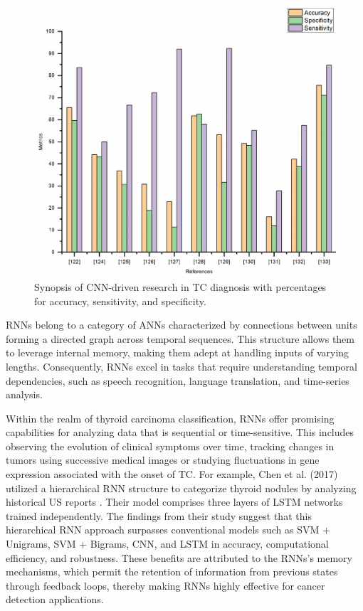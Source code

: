 \documentclass[a4paper,fleqn]{cas-sc}
\begin{document}
\begin{figure}[t!]
\centering
\includegraphics[scale=0.75]{fig5.pdf}
\caption{Synopsis of \ac{CNN}-driven research in TC diagnosis with percentages for accuracy, sensitivity, and specificity.}
\label{fig5}
\end{figure}



\Acp{RNN} belong to a category of \acp{ANN} characterized by connections between units forming a directed graph across temporal sequences. This structure allows them to leverage internal memory, making them adept at handling inputs of varying lengths. Consequently, \acp{RNN} excel in tasks that require understanding temporal dependencies, such as speech recognition, language translation, and time-series analysis.

Within the realm of thyroid carcinoma classification, \acp{RNN} offer promising capabilities for analyzing data that is sequential or time-sensitive. This includes observing the evolution of clinical symptoms over time, tracking changes in tumors using successive medical images or studying fluctuations in gene expression associated with the onset of TC. For example, Chen et al. (2017) utilized a hierarchical \ac{RNN} structure to categorize thyroid nodules by analyzing historical \ac{US} reports \cite{chen2017thyroid}. Their model comprises three layers of \ac{LSTM} networks trained independently. The findings from their study suggest that this hierarchical \ac{RNN} approach surpasses conventional models such as SVM + Unigrams, SVM + Bigrams, CNN, and LSTM in accuracy, computational efficiency, and robustness. These benefits are attributed to the \acp{RNN}'s memory mechanisms, which permit the retention of information from previous states through feedback loops, thereby making \acp{RNN} highly effective for cancer detection applications.
\end{document}
